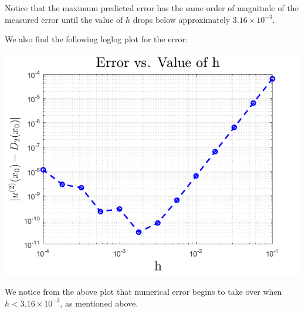 \documentclass{article}
\begin{document}
Notice that the maximum predicted error has the same order of magnitude of the measured error until the value of $h$ drops below approximately $3.16 \times 10^{-3}$.
\newline

We also find the following loglog plot for the error:

\begin{center}
    \includegraphics[scale = 0.6]{error_vs_h_plot.png}
\end{center}

We notice from the above plot that numerical error begins to take over when $h < 3.16 \times 10^{-3}$, as mentioned above.
\end{document}
